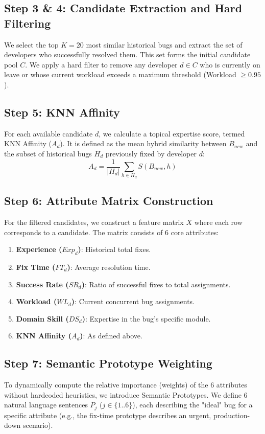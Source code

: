 \documentclass[conference]{IEEEtran}
\begin{document}
\subsection{Step 3 \& 4: Candidate Extraction and Hard Filtering}
We select the top $K=20$ most similar historical bugs and extract the set of developers who successfully resolved them. This set forms the initial candidate pool $C$.
We apply a hard filter to remove any developer $d \in C$ who is currently on leave or whose current workload exceeds a maximum threshold (Workload $\ge 0.95$).

\subsection{Step 5: KNN Affinity}
For each available candidate $d$, we calculate a topical expertise score, termed KNN Affinity ($A_d$). It is defined as the mean hybrid similarity between $B_{new}$ and the subset of historical bugs $H_d$ previously fixed by developer $d$:
\begin{equation}
A_d = \frac{1}{|H_d|} \sum_{h \in H_d} S(B_{new}, h)
\end{equation}

\subsection{Step 6: Attribute Matrix Construction}
For the filtered candidates, we construct a feature matrix $X$ where each row corresponds to a candidate. The matrix consists of 6 core attributes:
\begin{enumerate}
    \item \textbf{Experience ($Exp_d$)}: Historical total fixes.
    \item \textbf{Fix Time ($FT_d$)}: Average resolution time.
    \item \textbf{Success Rate ($SR_d$)}: Ratio of successful fixes to total assignments.
    \item \textbf{Workload ($WL_d$)}: Current concurrent bug assignments.
    \item \textbf{Domain Skill ($DS_d$)}: Expertise in the bug's specific module.
    \item \textbf{KNN Affinity ($A_d$)}: As defined above.
\end{enumerate}

\subsection{Step 7: Semantic Prototype Weighting}
To dynamically compute the relative importance (weights) of the 6 attributes without hardcoded heuristics, we introduce Semantic Prototypes. We define 6 natural language sentences $P_j$ ($j \in \{1..6\}$), each describing the "ideal" bug for a specific attribute (e.g., the fix-time prototype describes an urgent, production-down scenario).
\end{document}
